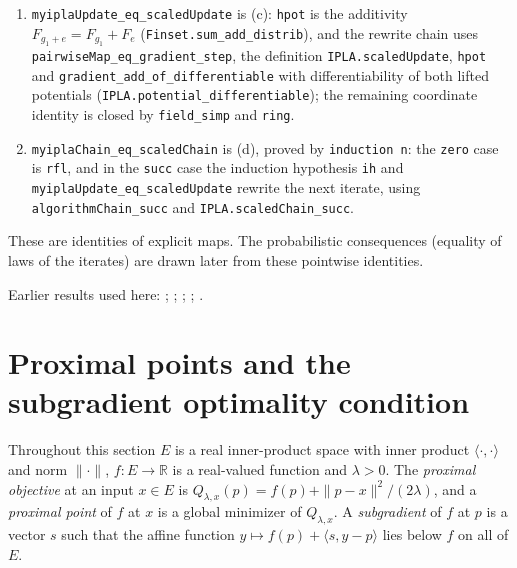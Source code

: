 \documentclass[11pt,a4paper]{report}
\begin{document}
\begin{leanbox}
\begin{enumerate}
\item \texttt{myipla\allowbreak{}Update\_\allowbreak{}eq\_\allowbreak{}scaled\allowbreak{}Update} is (c): \texttt{hpot} is the additivity \(F_{g_1+e}=F_{g_1}+F_e\) (\texttt{Finset.\allowbreak{}sum\_\allowbreak{}add\_\allowbreak{}distrib}), and the rewrite chain uses \texttt{pairwise\allowbreak{}Map\_\allowbreak{}eq\_\allowbreak{}gradient\_\allowbreak{}step}, the definition \texttt{IPLA.\allowbreak{}scaled\allowbreak{}Update}, \texttt{hpot} and \texttt{gradient\_\allowbreak{}add\_\allowbreak{}of\_\allowbreak{}differentiable} with differentiability of both lifted potentials (\texttt{IPLA.\allowbreak{}potential\_\allowbreak{}differentiable}); the remaining coordinate identity is closed by \texttt{field\_\allowbreak{}simp} and \texttt{ring}.

\item \texttt{myipla\allowbreak{}Chain\_\allowbreak{}eq\_\allowbreak{}scaled\allowbreak{}Chain} is (d), proved by \texttt{induction n}: the \texttt{zero} case is \texttt{rfl}, and in the \texttt{succ} case the induction hypothesis \texttt{ih} and \texttt{myipla\allowbreak{}Update\_\allowbreak{}eq\_\allowbreak{}scaled\allowbreak{}Update} rewrite the next iterate, using \texttt{algorithm\allowbreak{}Chain\_\allowbreak{}succ} and \texttt{IPLA.\allowbreak{}scaled\allowbreak{}Chain\_\allowbreak{}succ}.

\end{enumerate}



These are identities of explicit maps. The probabilistic consequences (equality of laws of the iterates) are drawn later from these pointwise identities.
\end{leanbox}


Earlier results used here: \cite[Section~3.1.1]{LangevinLean2026IPLA}; \cite[Section~3.1.3]{LangevinLean2026IPLA}; \cite[Section~3.1.5]{LangevinLean2026IPLA}; \cite[Section~3.1.7]{LangevinLean2026IPLA}; \cite[Section~3.4.2]{LangevinLean2026IPLA}.
\section{\texorpdfstring{Proximal points and the subgradient optimality condition}{Proximal points and the subgradient optimality condition}}
\label{proof-module-ProximalLangevin-Proximal-lean}


Throughout this section \(E\) is a real inner-product space with inner product \(\langle\cdot,\cdot\rangle\) and norm \(\|\cdot\|\), \(f:E\to\mathbb R\) is a real-valued function and \(\lambda>0\). The \emph{proximal objective} at an input \(x\in E\) is \(Q_{\lambda,x}(p)=f(p)+\|p-x\|^2/(2\lambda)\), and a \emph{proximal point} of \(f\) at \(x\) is a global minimizer of \(Q_{\lambda,x}\). A \emph{subgradient} of \(f\) at \(p\) is a vector \(s\) such that the affine function \(y\mapsto f(p)+\langle s,y-p\rangle\) lies below \(f\) on all of \(E\).
\end{document}
